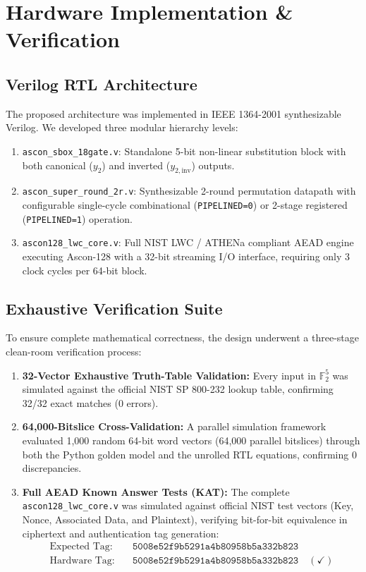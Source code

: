 \documentclass[journal,10pt]{IEEEtran}
\begin{document}
\section{Hardware Implementation & Verification}

\subsection{Verilog RTL Architecture}
The proposed architecture was implemented in IEEE 1364-2001 synthesizable Verilog. We developed three modular hierarchy levels:
\begin{enumerate}
    \item \texttt{ascon\_sbox\_18gate.v}: Standalone 5-bit non-linear substitution block with both canonical ($y_2$) and inverted ($y_{2,\text{inv}}$) outputs.
    \item \texttt{ascon\_super\_round\_2r.v}: Synthesizable 2-round permutation datapath with configurable single-cycle combinational (\texttt{PIPELINED=0}) or 2-stage registered (\texttt{PIPELINED=1}) operation.
    \item \texttt{ascon128\_lwc\_core.v}: Full NIST LWC / ATHENa compliant AEAD engine executing Ascon-128 with a 32-bit streaming I/O interface, requiring only 3 clock cycles per 64-bit block.
\end{enumerate}

\subsection{Exhaustive Verification Suite}
To ensure complete mathematical correctness, the design underwent a three-stage clean-room verification process:
\begin{enumerate}
    \item \textbf{32-Vector Exhaustive Truth-Table Validation:} Every input in $\mathbb{F}_2^5$ was simulated against the official NIST SP 800-232 lookup table, confirming 32/32 exact matches (0 errors).
    \item \textbf{64,000-Bitslice Cross-Validation:} A parallel simulation framework evaluated 1,000 random 64-bit word vectors (64,000 parallel bitslices) through both the Python golden model and the unrolled RTL equations, confirming 0 discrepancies.
    \item \textbf{Full AEAD Known Answer Tests (KAT):} The complete \texttt{ascon128\_lwc\_core.v} was simulated against official NIST test vectors (Key, Nonce, Associated Data, and Plaintext), verifying bit-for-bit equivalence in ciphertext and authentication tag generation:
    \begin{align*}
        \text{Expected Tag:} \quad & \texttt{5008e52f9b5291a4b80958b5a332b823} \\
        \text{Hardware Tag:} \quad & \texttt{5008e52f9b5291a4b80958b5a332b823} \quad (\checkmark)
    \end{align*}
\end{enumerate}
\end{document}
